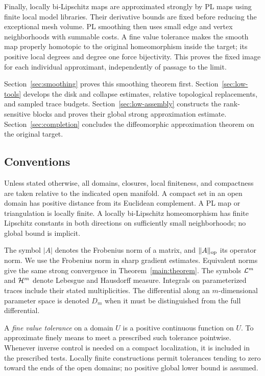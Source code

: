 Finally, locally bi-Lipschitz maps are approximated strongly by PL
maps using finite local model libraries. Their derivative bounds are
fixed before reducing the exceptional mesh volume. PL smoothing
then uses small edge and vertex neighborhoods with summable costs.
A fine value tolerance makes the smooth map properly homotopic to
the original homeomorphism inside the target; its positive local
degrees and degree one force bijectivity. This proves the fixed
image for each individual approximant, independently of passage
to the limit.

Section~\ref{sec:smoothing} proves this smoothing theorem first.
Section~\ref{sec:low-tools} develops the disk and collapse estimates,
relative topological replacements, and sampled trace budgets.
Section~\ref{sec:low-assembly} constructs the rank-sensitive blocks
and proves their global strong approximation estimate.
Section~\ref{sec:completion} concludes the diffeomorphic
approximation theorem on the original target.

\subsection{Conventions}

Unless stated otherwise, all domains, closures, local finiteness, and compactness are taken relative to the indicated open manifold. A compact set in an open domain has positive distance from its Euclidean complement. A PL map or triangulation is locally finite. A locally bi-Lipschitz homeomorphism has finite Lipschitz constants in both directions on sufficiently small neighborhoods; no global bound is implicit.

The symbol $|A|$ denotes the Frobenius norm of a matrix, and $\|A\|_{\mathrm{op}}$ its operator norm. We use the Frobenius norm in sharp gradient estimates. Equivalent norms give the same strong convergence in Theorem~\ref{main:theorem}. The symbols $\mathcal L^m$ and $\mathcal H^m$ denote Lebesgue and Hausdorff measure. Integrals on parameterized traces include their stated multiplicities. The differential along an $m$-dimensional parameter space is denoted $D_m$ when it must be distinguished from the full differential.

A \emph{fine value tolerance} on a domain $U$ is a positive continuous function on $U$. To approximate finely means to meet a prescribed such tolerance pointwise. Whenever inverse control is needed on a compact localization, it is included in the prescribed tests. Locally finite constructions permit tolerances tending to zero toward the ends of the open domains; no positive global lower bound is assumed.

